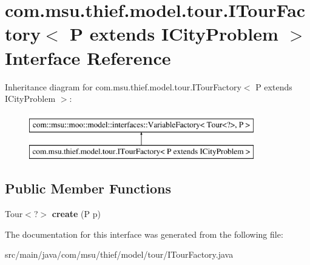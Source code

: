 \hypertarget{interfacecom_1_1msu_1_1thief_1_1model_1_1tour_1_1ITourFactory_3_01P_01extends_01ICityProblem_01_4}{\section{com.\-msu.\-thief.\-model.\-tour.\-I\-Tour\-Factory$<$ P extends I\-City\-Problem $>$ Interface Reference}
\label{interfacecom_1_1msu_1_1thief_1_1model_1_1tour_1_1ITourFactory_3_01P_01extends_01ICityProblem_01_4}
}
Inheritance diagram for com.\-msu.\-thief.\-model.\-tour.\-I\-Tour\-Factory$<$ P extends I\-City\-Problem $>$\-:\begin{figure}[H]
\begin{center}
\leavevmode
\includegraphics[height=2.000000cm]{interfacecom_1_1msu_1_1thief_1_1model_1_1tour_1_1ITourFactory_3_01P_01extends_01ICityProblem_01_4}
\end{center}
\end{figure}
\subsection*{Public Member Functions}
\begin{DoxyCompactItemize}
\item 
\hypertarget{interfacecom_1_1msu_1_1thief_1_1model_1_1tour_1_1ITourFactory_3_01P_01extends_01ICityProblem_01_4_a0121b64f9ae59e3382d6abe05bbe99cf}{Tour$<$?$>$ {\bfseries create} (P p)}\label{interfacecom_1_1msu_1_1thief_1_1model_1_1tour_1_1ITourFactory_3_01P_01extends_01ICityProblem_01_4_a0121b64f9ae59e3382d6abe05bbe99cf}

\end{DoxyCompactItemize}


The documentation for this interface was generated from the following file\-:\begin{DoxyCompactItemize}
\item 
src/main/java/com/msu/thief/model/tour/I\-Tour\-Factory.\-java\end{DoxyCompactItemize}
